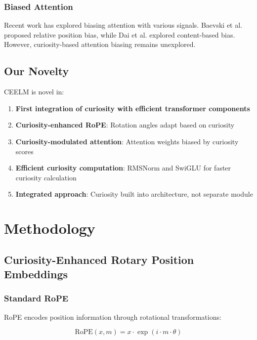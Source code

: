 \documentclass{IEEEtran}
\begin{document}
\subsubsection{Biased Attention}

Recent work has explored biasing attention with various signals. Baevski et al. \cite{baevski2020} proposed relative position bias, while Dai et al. \cite{dai2019} explored content-based bias. However, curiosity-based attention biasing remains unexplored.

\subsection{Our Novelty}

CEELM is novel in:
\begin{enumerate}
    \item \textbf{First integration of curiosity with efficient transformer components}
    \item \textbf{Curiosity-enhanced RoPE}: Rotation angles adapt based on curiosity
    \item \textbf{Curiosity-modulated attention}: Attention weights biased by curiosity scores
    \item \textbf{Efficient curiosity computation}: RMSNorm and SwiGLU for faster curiosity calculation
    \item \textbf{Integrated approach}: Curiosity built into architecture, not separate module
\end{enumerate}

\section{Methodology}

\subsection{Curiosity-Enhanced Rotary Position Embeddings}

\subsubsection{Standard RoPE}

RoPE encodes position information through rotational transformations:

\begin{equation}
\text{RoPE}(x, m) = x \cdot \exp(i \cdot m \cdot \theta)
\end{equation}
\end{document}
